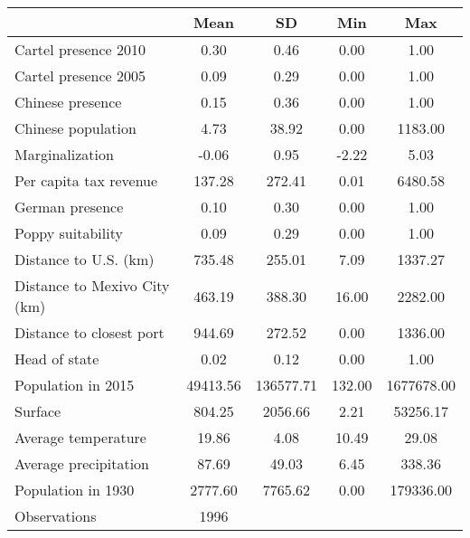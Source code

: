 {
\def\sym#1{\ifmmode^{#1}\else\(^{#1}\)\fi}
\begin{tabular}{l*{1}{cccc}}
\hline\hline
                    &        Mean&          SD&         Min&         Max\\
\hline
Cartel presence 2010&        0.30&        0.46&        0.00&        1.00\\
Cartel presence 2005&        0.09&        0.29&        0.00&        1.00\\
Chinese presence    &        0.15&        0.36&        0.00&        1.00\\
Chinese population  &        4.73&       38.92&        0.00&     1183.00\\
Marginalization     &       -0.06&        0.95&       -2.22&        5.03\\
Per capita tax revenue&      137.28&      272.41&        0.01&     6480.58\\
German presence     &        0.10&        0.30&        0.00&        1.00\\
Poppy suitability   &        0.09&        0.29&        0.00&        1.00\\
Distance to U.S. (km)&      735.48&      255.01&        7.09&     1337.27\\
Distance to Mexivo City (km)&      463.19&      388.30&       16.00&     2282.00\\
Distance to closest port&      944.69&      272.52&        0.00&     1336.00\\
Head of state       &        0.02&        0.12&        0.00&        1.00\\
Population in 2015  &    49413.56&   136577.71&      132.00&  1677678.00\\
Surface             &      804.25&     2056.66&        2.21&    53256.17\\
Average temperature &       19.86&        4.08&       10.49&       29.08\\
Average precipitation&       87.69&       49.03&        6.45&      338.36\\
Population in 1930  &     2777.60&     7765.62&        0.00&   179336.00\\
\hline
Observations        &        1996&            &            &            \\
\hline\hline
\end{tabular}
}
